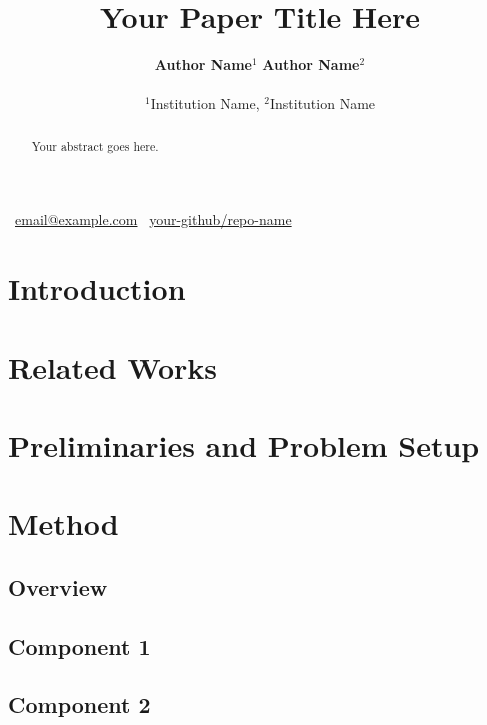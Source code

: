 \documentclass{article}
\title{Your Paper Title Here}
\author{%
  \textbf{Author Name}${}^{1}$ \quad
  \textbf{Author Name}${}^{2}$ \\
  \\
  ${}^{1}$Institution Name, ${}^{2}$Institution Name \\
}
\begin{document}
\newcommand{\contactline}[2]{%
  \vspace{-1.8em}
  \begin{center}
    \faEnvelope~\href{mailto:#1}{#1}\quad
    \faGithub~\href{https://github.com/#2}{#2}
  \end{center}
  \vspace{+0.2em}
}

\maketitle
\contactline{email@example.com}{your-github/repo-name}

\begin{abstract}
Your abstract goes here.
\end{abstract}

\section{Introduction}

\section{Related Works}

\section{Preliminaries and Problem Setup}

\section{Method}

\subsection{Overview}

\subsection{Component 1}

\subsection{Component 2}
\end{document}
